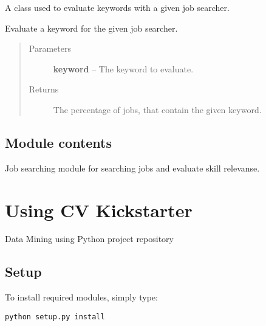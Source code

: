\documentclass[letterpaper,10pt,english]{sphinxmanual}
\begin{document}
\begin{fulllineitems}
\label{job_searcher:job_searcher.keyword_evaluator.KeywordEvaluator}
A class used to evaluate keywords with a given job searcher.

\begin{fulllineitems}
\label{job_searcher:job_searcher.keyword_evaluator.KeywordEvaluator.evaluate_keyword}
Evaluate a keyword for the given job searcher.
\begin{quote}\begin{description}
\item[{Parameters}] \leavevmode
\textbf{keyword} -- The keyword to evaluate.

\item[{Returns}] \leavevmode
The percentage of jobs, that contain the given keyword.

\end{description}\end{quote}

\end{fulllineitems}


\end{fulllineitems}



\section{Module contents}
\label{job_searcher:module-job_searcher}\label{job_searcher:module-contents}
Job searching module for searching jobs and evaluate skill relevanse.


\chapter{Using CV Kickstarter}
\label{index:using-cv-kickstarter}
Data Mining using Python project repository


\section{Setup}
\label{index:setup}
To install required modules, simply type:

\begin{Verbatim}[commandchars=\\\{\}]
python setup.py install
\end{Verbatim}
\end{document}
